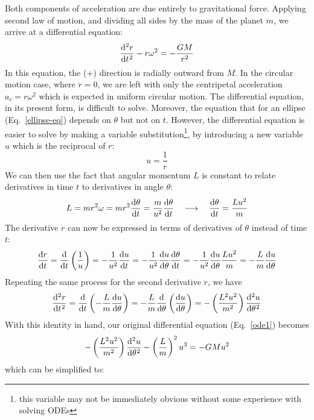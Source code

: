 \documentclass{../../../oss-handout}
\begin{document}
Both components of acceleration are due entirely to gravitational force.
Applying second law of motion, and dividing all sides by the mass of the planet
$m$, we arrive at a differential equation:
\begin{equation}
  \diff[2]rt-r\omega^2=-\frac{GM}{r^2}
  \label{ode1}
\end{equation}
In this equation, the ($+$) direction is radially outward from $M$. In the
circular motion case, where $\ddot r=0$, we are left with only the centripetal
acceleration $a_c=r\omega^2$ which is expected in uniform circular motion. The
differential equation, in its present form, is difficult to solve. Moreover,
the equation that for an ellipse (Eq.~\ref{ellipse-eq}) depends on $\theta$ but
not on $t$. However, the differential equation is easier to solve by making a
variable substitution\footnote{this variable may not be immediately obvious
  without some experience with solving ODEs}, by introducing a new variable $u$
which is the reciprocal of $r$:
\begin{equation}
  u=\frac1r
\end{equation}
We can then use the fact that angular momentum $L$ is constant to relate
derivatives in time $t$ to derivatives in angle $\theta$:
\begin{equation}
  L=mr^2\omega=mr^2\diff{\theta}t=\frac m{u^2}\diff{\theta}t
  \quad\longrightarrow\quad
  \diff{\theta}t=\frac{Lu^2}m
\end{equation}
The derivative $\dot r$ can now be expressed in terms of derivatives of
$\theta$ instead of time $t$:
\begin{equation}
  \diff rt =\diff*{\left(\frac1u\right)}t
  =-\frac1{u^2}\diff ut=-\frac1{u^2}\diff u\theta\diff{\theta}t
  = -\frac1{u^2}\diff u\theta \frac{Lu^2}m
  = -\frac Lm\diff u\theta
\end{equation}
Repeating the same process for the second derivative $\ddot r$, we have
\begin{equation}
  \diff[2] rt = \diff*{\left(-\frac Lm\diff u\theta\right)}t
  = -\frac Lm\diff*{\left(\diff u\theta\right)}\theta \\
  = -\left(\frac{L^2u^2}{m^2}\right)\diff[2]u\theta
\end{equation}
With this identity in hand, our original differential equation
(Eq.~\ref{ode1}) becomes
\begin{equation}
  -\left(\frac{L^2u^2}{m^2}\right)\diff[2]u\theta-\left(\frac Lm\right)^2u^3
  = -GMu^2
\end{equation}
which can be simplified to:
\end{document}
